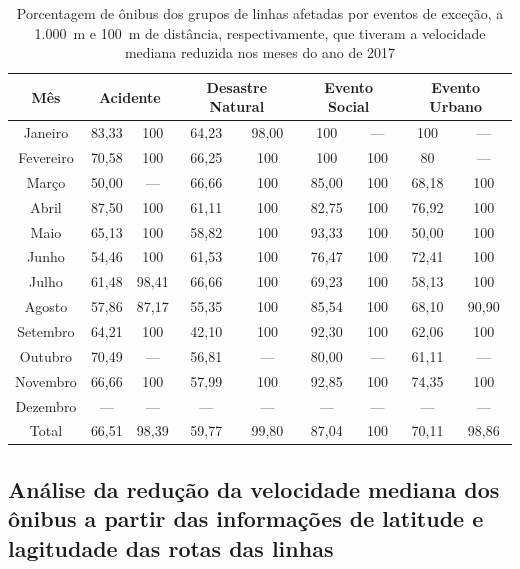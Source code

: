 \documentclass[
	12pt,				%
	oneside,			%
	a4paper,			%
	english,			%
	brazil				%
	]{abntex2ppgsi}
\begin{document}
{{{\begin{table}[!htb]
\centering
\caption {Porcentagem de ônibus dos grupos de linhas afetadas por eventos de exceção, a 1.000~m e 100~m de distância, respectivamente, que tiveram a velocidade mediana reduzida nos meses do ano de 2017}
\label{tab:exceptEventVelocityImpAllStop}
\begin{tabular}{c|cc|cc|cc|cc}
\toprule
\textbf{Mês} & \multicolumn{2}{c}{\textbf{Acidente}} & \multicolumn{2}{c}{\textbf{Desastre Natural}} & \multicolumn{2}{c}{\textbf{Evento Social}} &
\multicolumn{2}{c}{\textbf{Evento Urbano}}\\
\midrule
Janeiro & 83,33 &  100 & 
64,23 &  98,00 & 
100 & --- &
 100 & --- \\
\hline
Fevereiro & 70,58 &  100 &
 66,25 &  100 &
 100 & 100 &
 80 & --- \\
\hline
Março &  50,00 &  --- & 
66,66 &  100 &
85,00 & 100 &
68,18 & 100 \\
\hline
Abril & 87,50 &100 & 
 61,11 & 100 & 
 82,75 & 100 & 
 76,92 &  100 \\
\hline
Maio & 65,13 &  100 &
 58,82 &  100 &
 93,33 & 100 &
 50,00 & 100 \\
\hline
Junho & 54,46 &  100 &
 61,53 &  100 &
 76,47 & 100 &
 72,41 & 100 \\
\hline
Julho & 61,48 &  98,41 &
 66,66 & 100 &
 69,23 & 100 &
58,13 & 100 \\
\hline
Agosto & 57,86 & 87,17 &
 55,35 & 100 &
 85,54 & 100 & 
 68,10 & 90,90 \\
\hline
Setembro & 64,21 & 100 &
 42,10 & 100 &
 92,30 & 100 & 
 62,06 & 100 \\
\hline
Outubro & 70,49 & --- &
 56,81 & --- &
 80,00 & --- &
 61,11 & --- \\
\hline
Novembro & 66,66 & 100 &
 57,99 & 100 &
 92,85 & 100 &
 74,35 & 100 \\
\hline
Dezembro & --- & --- & --- & --- & --- & --- & --- & ---  \\
\midrule
\midrule
Total & 66,51 & 98,39 & 59,77 & 99,80 & 87,04 & 100 & 70,11 & 98,86  \\
\bottomrule
\end{tabular}
\end{table}

\subsection*{Análise da redução da velocidade mediana dos ônibus a partir das informações de latitude e lagitudade das rotas das linhas}

}}}
\end{document}

